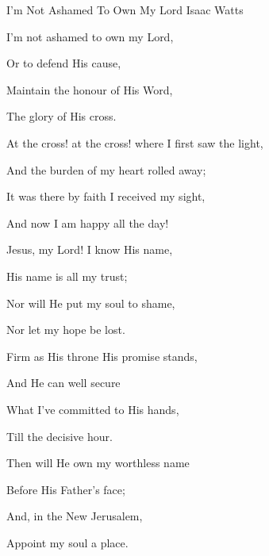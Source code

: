 \documentclass[12pt]{book}
\newcommand{\WBColBrk}{%
  \ifWordBk%
  \newpage%
\fi}
\begin{document}
\begin{song}{I'm Not Ashamed To Own My Lord}{}
  {\SBPubDom}
  {Isaac Watts}
  {}
  {}

  \begin{SBVerse}
    I'm not ashamed to own my Lord,

    Or to defend His cause,

    Maintain the honour of His Word,

    The glory of His cross.
  \end{SBVerse}

  \begin{SBOpGroup}
    At the cross! at the cross! where I first saw the light,

    And the burden of my heart rolled away;

    It was there by faith I received my sight,

    And now I am happy all the day!
  \end{SBOpGroup}

  \begin{SBVerse}
    Jesus, my Lord! I know His name,

    His name is all my trust;

    Nor will He put my soul to shame,

    Nor let my hope be lost.
  \end{SBVerse}

  \begin{SBVerse}
    Firm as His throne His promise stands,

    And He can well secure

    What I've committed to His hands,

    Till the decisive hour.
  \end{SBVerse}

  \begin{SBVerse}
    Then will He own my worthless name

    Before His Father's face;

    And, in the New Jerusalem,

    Appoint my soul a place.
  \end{SBVerse}
\end{song}

\WBColBrk
\end{document}
